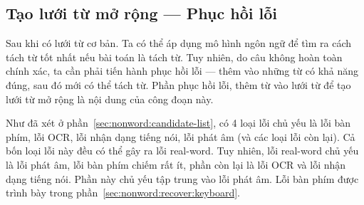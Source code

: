 \documentclass[a4paper,oneside,14pt]{extbook} %
\begin{document}
\subsection{Tạo lưới từ mở rộng --- Phục hồi lỗi}
\label{sec:realword:recover}

Sau khi có lưới từ cơ bản. Ta có thể áp dụng mô hình ngôn ngữ để tìm
ra cách tách từ tốt nhất nếu bài toán là tách từ. Tuy nhiên, do câu
không hoàn toàn chính xác, ta cần phải tiến hành phục hồi lỗi --- thêm
vào những từ có khả năng đúng, sau đó mới có thể tách từ. Phần phục
hồi lỗi, thêm từ vào lưới từ để tạo lưới từ mở rộng là nội dung của
công đoạn này.

Như đã xét ở phần~\ref{sec:nonword:candidate-list}, có 4 loại lỗi chủ
yếu là lỗi bàn phím, lỗi OCR, lỗi nhận dạng tiếng nói, lỗi phát âm (và
các loại lỗi còn lại). Cả bốn loại lỗi này đều có thể gây ra lỗi
real-word. Tuy nhiên, lỗi real-word chủ yếu là lỗi phát âm, lỗi bàn
phím chiếm rất ít, phần còn lại là lỗi OCR và lỗi nhận dạng tiếng
nói. Phần này chủ yếu tập trung vào lỗi phát âm. Lỗi bàn phím được
trình bày trong phần~\ref{sec:nonword:recover:keyboard}.

\end{document}
